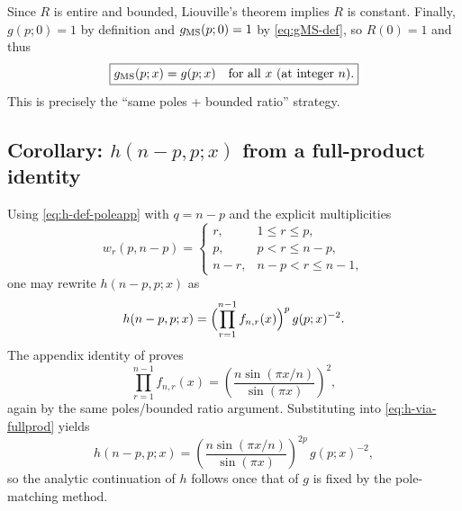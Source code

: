 \documentclass[11pt]{article}
\begin{document}
  Since $R$ is entire and bounded, Liouville's theorem implies $R$ is constant.
  Finally, $g(p;0)=1$ by definition and $g_{\rm MS}(p;0)=1$ by \eqref{eq:gMS-def},
  so $R(0)=1$ and thus
  \begin{equation}
    \boxed{g_{\rm MS}(p;x)=g(p;x)\quad \text{for all }x\ \text{(at integer }n\text{).}}
  \end{equation}
  This is precisely the ``same poles + bounded ratio'' strategy.

  \subsection*{Corollary: $h(n-p,p;x)$ from a full-product identity}

  Using \eqref{eq:h-def-poleapp} with $q=n-p$ and the explicit multiplicities
  \begin{equation}
    w_{r}(p,n-p)=
    \begin{cases}
      r,   & 1\le r\le p,  \\
      p,   & p<r\le n-p,   \\
      n-r, & n-p<r\le n-1,
    \end{cases}
  \end{equation}
  one may rewrite $h(n-p,p;x)$ as
  \begin{equation}
    h(n-p,p;x)=\Bigl(\prod_{r=1}^{n-1}f_{n,r}(x)\Bigr)^{p}\,g(p;x)^{-2}. \label{eq:h-via-fullprod}
  \end{equation}
  The appendix identity of 
  \cite{Lashkari_2016}
  proves
  \begin{equation}
    \prod_{r=1}^{n-1}f_{n,r}(x)=\left(\frac{n\sin(\pi x/n)}{\sin(\pi x)}\right)^{2}
    ,
  \end{equation}
  again by the same poles/bounded ratio argument. Substituting into \eqref{eq:h-via-fullprod}
  yields
  \begin{equation}
    \boxed{ h(n-p,p;x) = \left(\frac{n\sin(\pi x/n)}{\sin(\pi x)}\right)^{2p}\,g(p;x)^{-2}, }
  \end{equation}
  so the analytic continuation of $h$ follows once that of $g$ is fixed by the
  pole-matching method.
\end{document}

